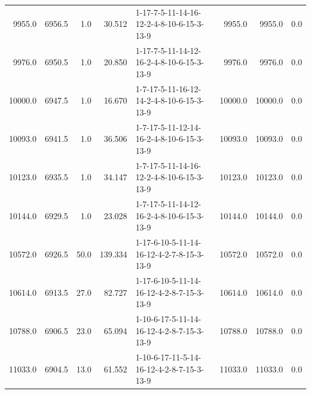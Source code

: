 \begin{tabular}{rrrrlrrr}
  9955.0 &  6956.5 &            1.0 &             30.512 &  1-17-7-5-11-14-16-12-2-4-8-10-6-15-3-13-9 &        9955.0 &          9955.0 &       0.0 \\
  9976.0 &  6950.5 &            1.0 &             20.850 &  1-17-7-5-11-14-12-16-2-4-8-10-6-15-3-13-9 &        9976.0 &          9976.0 &       0.0 \\
 10000.0 &  6947.5 &            1.0 &             16.670 &  1-7-17-5-11-16-12-14-2-4-8-10-6-15-3-13-9 &       10000.0 &         10000.0 &       0.0 \\
 10093.0 &  6941.5 &            1.0 &             36.506 &  1-7-17-5-11-12-14-16-2-4-8-10-6-15-3-13-9 &       10093.0 &         10093.0 &       0.0 \\
 10123.0 &  6935.5 &            1.0 &             34.147 &  1-7-17-5-11-14-16-12-2-4-8-10-6-15-3-13-9 &       10123.0 &         10123.0 &       0.0 \\
 10144.0 &  6929.5 &            1.0 &             23.028 &  1-7-17-5-11-14-12-16-2-4-8-10-6-15-3-13-9 &       10144.0 &         10144.0 &       0.0 \\
 10572.0 &  6926.5 &           50.0 &            139.334 &  1-17-6-10-5-11-14-16-12-4-2-7-8-15-3-13-9 &       10572.0 &         10572.0 &       0.0 \\
 10614.0 &  6913.5 &           27.0 &             82.727 &  1-17-6-10-5-11-14-16-12-4-2-8-7-15-3-13-9 &       10614.0 &         10614.0 &       0.0 \\
 10788.0 &  6906.5 &           23.0 &             65.094 &  1-10-6-17-5-11-14-16-12-4-2-8-7-15-3-13-9 &       10788.0 &         10788.0 &       0.0 \\
 11033.0 &  6904.5 &           13.0 &             61.552 &  1-10-6-17-11-5-14-16-12-4-2-8-7-15-3-13-9 &       11033.0 &         11033.0 &       0.0 \\
\bottomrule
\end{tabular}
